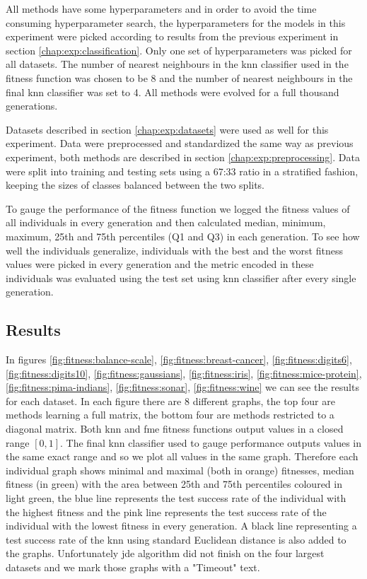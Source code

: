 \documentclass[12pt,a4paper]{report}
\begin{document}
All methods have some hyperparameters and in order to avoid the time consuming hyperparameter search, the hyperparameters for the models in this experiment were picked according to results from the previous experiment in section \ref{chap:exp:classification}. Only one set of hyperparameters was picked for all datasets. The number of nearest neighbours in the \ac{knn} classifier used in the fitness function was chosen to be 8 and the number of nearest neighbours in the final \ac{knn} classifier was set to 4. All methods were evolved for a full thousand generations.

Datasets described in section \ref{chap:exp:datasets} were used as well for this experiment. Data were preprocessed and standardized the same way as previous experiment, both methods are described in section \ref{chap:exp:preprocessing}. Data were split into training and testing sets using a 67:33 ratio in a stratified fashion, keeping the sizes of classes balanced between the two splits.

To gauge the performance of the fitness function we logged the fitness values of all individuals in every generation and then calculated median, minimum, maximum, 25th and 75th percentiles (Q1 and Q3) in each generation. To see how well the individuals generalize, individuals with the best and the worst fitness values were picked in every generation and the metric encoded in these individuals was evaluated using the test set using \ac{knn} classifier after every single generation.

\subsection{Results}

In figures \ref{fig:fitness:balance-scale}, \ref{fig:fitness:breast-cancer}, \ref{fig:fitness:digits6}, \ref{fig:fitness:digits10}, \ref{fig:fitness:gaussians}, \ref{fig:fitness:iris}, \ref{fig:fitness:mice-protein}, \ref{fig:fitness:pima-indians}, \ref{fig:fitness:sonar}, \ref{fig:fitness:wine} we can see the results for each dataset. In each figure there are 8 different graphs, the top four are methods learning a full matrix, the bottom four are methods restricted to a diagonal matrix. Both \ac{knn} and \ac{fme} fitness functions output values in a closed range $[0,1]$. The final \ac{knn} classifier used to gauge performance outputs values in the same exact range and so we plot all values in the same graph. Therefore each individual graph shows minimal and maximal (both in orange) fitnesses, median fitness (in green) with the area between 25th and 75th percentiles coloured in light green, the blue line represents the test success rate of the individual with the highest fitness and the pink line represents the test success rate of the individual with the lowest fitness in every generation. A black line representing a test success rate of the \ac{knn} using standard Euclidean distance is also added to the graphs. Unfortunately \ac{jde} algorithm did not finish on the four largest datasets and we mark those graphs with a "Timeout" text.
\end{document}
